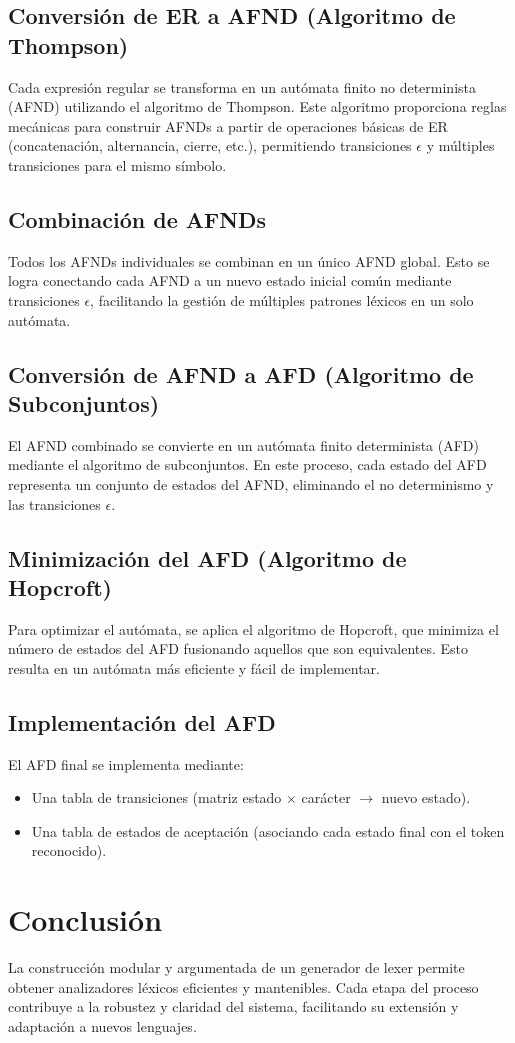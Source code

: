 \documentclass[a4paper,12pt]{article}
\begin{document}
\subsection{Conversión de ER a AFND (Algoritmo de Thompson)}
Cada expresión regular se transforma en un autómata finito no determinista (AFND) utilizando el algoritmo de Thompson. Este algoritmo proporciona reglas mecánicas para construir AFNDs a partir de operaciones básicas de ER (concatenación, alternancia, cierre, etc.), permitiendo transiciones $\epsilon$ y múltiples transiciones para el mismo símbolo.

\subsection{Combinación de AFNDs}
Todos los AFNDs individuales se combinan en un único AFND global. Esto se logra conectando cada AFND a un nuevo estado inicial común mediante transiciones $\epsilon$, facilitando la gestión de múltiples patrones léxicos en un solo autómata.

\subsection{Conversión de AFND a AFD (Algoritmo de Subconjuntos)}
El AFND combinado se convierte en un autómata finito determinista (AFD) mediante el algoritmo de subconjuntos. En este proceso, cada estado del AFD representa un conjunto de estados del AFND, eliminando el no determinismo y las transiciones $\epsilon$.

\subsection{Minimización del AFD (Algoritmo de Hopcroft)}
Para optimizar el autómata, se aplica el algoritmo de Hopcroft, que minimiza el número de estados del AFD fusionando aquellos que son equivalentes. Esto resulta en un autómata más eficiente y fácil de implementar.

\subsection{Implementación del AFD}
El AFD final se implementa mediante:
\begin{itemize}
    \item Una tabla de transiciones (matriz estado $\times$ carácter $\rightarrow$ nuevo estado).
    \item Una tabla de estados de aceptación (asociando cada estado final con el token reconocido).
\end{itemize}

\section{Conclusión}
La construcción modular y argumentada de un generador de lexer permite obtener analizadores léxicos eficientes y mantenibles. Cada etapa del proceso contribuye a la robustez y claridad del sistema, facilitando su extensión y adaptación a nuevos lenguajes.
\end{document}
